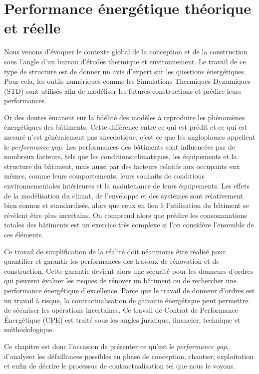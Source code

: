 \chapter{Performance énergétique théorique et réelle}

Nous venons d'évoquer le contexte global de la conception et de la construction sous l'angle d'un bureau d'études thermique et environnement. Le travail de ce type de structure est de donner un avis d'expert sur les questions énergétiques. Pour cela, les outils numériques comme les Simulations Thermiques Dynamiques (STD) sont utilisés afin de modéliser les futures constructions et prédire leurs performances.

Or des doutes émanent sur la fidélité des modèles à reproduire les phénomènes énergétiques des bâtiments. Cette différence entre ce qui est prédit et ce qui est mesuré n'est généralement pas anecdotique, c'est ce que les anglophones appellent le \textit{performance gap}. Les performances des bâtiments sont influencées par de nombreux facteurs, tels que les conditions climatiques, les équipements et la structure du bâtiment, mais aussi par des facteurs relatifs aux occupants eux mêmes, comme leurs comportements, leurs souhaits de conditions environnementales intérieures et la maintenance de leurs équipements. Les effets de la modélisation du climat, de l'enveloppe et des systèmes sont relativement bien connus et standardisés, alors que ceux en lien à l'utilisation du bâtiment se révèlent être plus incertains. On comprend alors que prédire les consommations totales des bâtiments est un exercice très complexe si l'on considère l'ensemble de ces éléments.

Ce travail de simplification de la réalité doit néanmoins être réalisé pour quantifier et garantir les performances des travaux de rénovation et de construction. Cette garantie devient alors une sécurité pour les donneurs d'ordres qui peuvent évaluer les risques de rénover un bâtiment ou de rechercher une performance énergétique d'excellence. Parce que le travail de donneur d'ordres est un travail à risque, la contractualisation de garantie énergétique peut permettre de sécuriser les opérations incertaines. Ce travail de Contrat de Performance Énergétique (CPE) est traité sous les angles juridique, financier, technique et méthodologique. 

Ce chapitre est donc l'occasion de présenter ce qu'est le \textit{performance gap}, d'analyser les défaillances possibles en phase de conception, chantier, exploitation et enfin de décrire le processus de contractualisation tel que nous le voyons.

